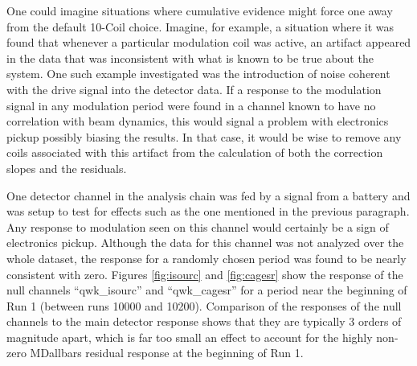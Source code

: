 One could imagine situations where cumulative evidence might force one away from the default 10-Coil choice.  Imagine, for example, a situation where it was found that whenever a particular modulation coil was active, an artifact appeared in the data that was inconsistent with what is known to be true about the system. One such example investigated was the introduction of noise coherent with the drive signal into the detector data. If a response to the modulation signal in any modulation period were found in a channel known to have no correlation with beam dynamics, this would signal a problem with electronics pickup possibly biasing the results. In that case, it would be wise to remove any coils associated with this artifact from the calculation of both the correction slopes and the residuals. 

One detector channel in the \Qs analysis chain was fed by a signal from a battery and was setup to test for effects such as the one mentioned in the previous paragraph. Any response to modulation seen on this channel would certainly be a sign of electronics pickup. Although the data for this channel was not analyzed over the whole \Qs dataset, the response for a randomly chosen period was found to be nearly consistent with zero. Figures \ref{fig:isourc} and \ref{fig:cagesr} show the response of the null channels ``qwk\_isourc'' and ``qwk\_cagesr'' for a period near the beginning of Run 1 (between runs 10000 and 10200). Comparison of the responses of the null channels to the main detector response shows that they are typically 3 orders of magnitude apart, which is far too small an effect to account for the highly non-zero MDallbars residual response at the beginning of Run 1.

